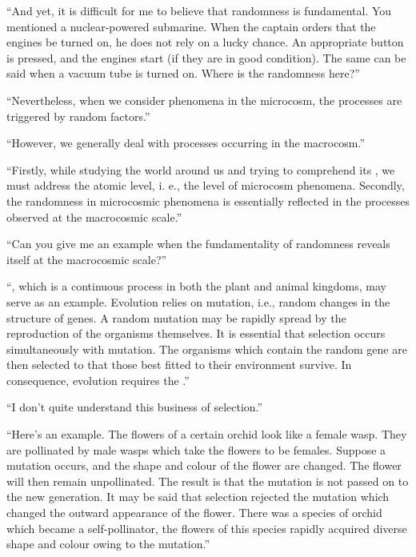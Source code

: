 \begin{dialogue}
\rdr  ``And yet, it is difficult for me to believe that
  randomness is fundamental. You mentioned a nuclear-powered
  submarine. When the captain orders that the engines be turned on, he
  does not rely on a lucky chance. An appropriate button is pressed,
  and the engines start (if they are in good condition). The same can
  be said when a vacuum tube is turned on. Where is the randomness here?''

\athr  ``Nevertheless, when we consider phenomena in the
  microcosm, the processes are triggered by random factors.'' 

\rdr  ``However, we generally deal with processes
  occurring in the macrocosm.''

\athr  ``Firstly, while studying the world around us and
  trying to comprehend its , we must
  address the atomic level, i. e., the level of microcosm
  phenomena. Secondly, the randomness in microcosmic phenomena is
  essentially reflected in the processes observed at the macrocosmic scale.''
  
\rdr  ``Can you give me an example when the
  fundamentality of randomness reveals itself at the macrocosmic scale?''
  
\athr ``, which is a continuous process in both
  the plant and animal kingdoms, may serve as an example. Evolution
  relies on mutation, i.e., random changes in the structure of
  genes. A random mutation may be rapidly spread by the reproduction
  of the organisms themselves. It is essential that selection occurs
  simultaneously with mutation. The organisms which contain the random
  gene are then selected to that those best fitted to their
  environment survive. In consequence, evolution requires the
  .''

\rdr  ``I don't quite understand this business of
  selection.''
  
\athr ``Here's an example. The flowers of a certain
  orchid look like a female wasp. They are pollinated by male wasps
  which take the flowers to be females. Suppose a mutation occurs, and
  the shape and colour of the flower are changed. The flower will then
  remain unpollinated. The result is that the mutation is not passed
  on to the new generation. It may be said that selection rejected the
  mutation which changed the outward appearance of the flower. There
  was a species of orchid which became a self-pollinator, the flowers
  of this  species rapidly acquired diverse shape and colour owing to
  the mutation.''


\end{dialogue}
